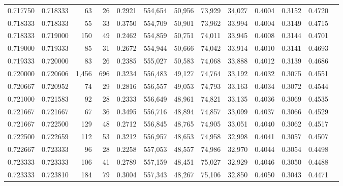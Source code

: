 \begin{tabular}{rrrrrrrrrrrrr}
0.717750 & 0.718333 &    63 &  26 &                                     0.2921 & 554,654 &  50,956 &  73,929 &  34,027 & 0.4004 & 0.3152 & 0.4720 \\
0.718333 & 0.718333 &    55 &  33 &                                     0.3750 & 554,709 &  50,901 &  73,962 &  33,994 & 0.4004 & 0.3149 & 0.4715 \\
0.718333 & 0.719000 &   150 &  49 &                                     0.2462 & 554,859 &  50,751 &  74,011 &  33,945 & 0.4008 & 0.3144 & 0.4701 \\
0.719000 & 0.719333 &    85 &  31 &                                     0.2672 & 554,944 &  50,666 &  74,042 &  33,914 & 0.4010 & 0.3141 & 0.4693 \\
0.719333 & 0.720000 &    83 &  26 &                                     0.2385 & 555,027 &  50,583 &  74,068 &  33,888 & 0.4012 & 0.3139 & 0.4686 \\
0.720000 & 0.720606 & 1,456 & 696 &                                     0.3234 & 556,483 &  49,127 &  74,764 &  33,192 & 0.4032 & 0.3075 & 0.4551 \\
0.720667 & 0.720952 &    74 &  29 &                                     0.2816 & 556,557 &  49,053 &  74,793 &  33,163 & 0.4034 & 0.3072 & 0.4544 \\
0.721000 & 0.721583 &    92 &  28 &                                     0.2333 & 556,649 &  48,961 &  74,821 &  33,135 & 0.4036 & 0.3069 & 0.4535 \\
0.721667 & 0.721667 &    67 &  36 &                                     0.3495 & 556,716 &  48,894 &  74,857 &  33,099 & 0.4037 & 0.3066 & 0.4529 \\
0.721667 & 0.722500 &   129 &  48 &                                     0.2712 & 556,845 &  48,765 &  74,905 &  33,051 & 0.4040 & 0.3062 & 0.4517 \\
0.722500 & 0.722659 &   112 &  53 &                                     0.3212 & 556,957 &  48,653 &  74,958 &  32,998 & 0.4041 & 0.3057 & 0.4507 \\
0.722667 & 0.723333 &    96 &  28 &                                     0.2258 & 557,053 &  48,557 &  74,986 &  32,970 & 0.4044 & 0.3054 & 0.4498 \\
0.723333 & 0.723333 &   106 &  41 &                                     0.2789 & 557,159 &  48,451 &  75,027 &  32,929 & 0.4046 & 0.3050 & 0.4488 \\
0.723333 & 0.723810 &   184 &  79 &                                     0.3004 & 557,343 &  48,267 &  75,106 &  32,850 & 0.4050 & 0.3043 & 0.4471 \\

\end{tabular}
